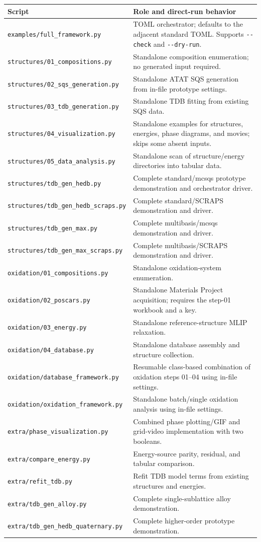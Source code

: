 \documentclass[11pt,letterpaper]{article}
\newcommand{\file}[1]{\nolinkurl{#1}}
\begin{document}
\begin{longtable}{p{}p{}}
\toprule
Script & Role and direct-run behavior \\
\midrule
\endhead
\file{examples/full_framework.py} & TOML orchestrator; defaults to the adjacent standard TOML. Supports \file{--check} and \file{--dry-run}. \\
\file{structures/01_compositions.py} & Standalone composition enumeration; no generated input required. \\
\file{structures/02_sqs_generation.py} & Standalone ATAT SQS generation from in-file prototype settings. \\
\file{structures/03_tdb_generation.py} & Standalone TDB fitting from existing SQS data. \\
\file{structures/04_visualization.py} & Standalone examples for structures, energies, phase diagrams, and movies; skips some absent inputs. \\
\file{structures/05_data_analysis.py} & Standalone scan of structure/energy directories into tabular data. \\
\file{structures/tdb_gen_hedb.py} & Complete standard/mcsqs prototype demonstration and orchestrator driver. \\
\file{structures/tdb_gen_hedb_scraps.py} & Complete standard/SCRAPS demonstration and driver. \\
\file{structures/tdb_gen_max.py} & Complete multibasis/mcsqs demonstration and driver. \\
\file{structures/tdb_gen_max_scraps.py} & Complete multibasis/SCRAPS demonstration and driver. \\
\file{oxidation/01_compositions.py} & Standalone oxidation-system enumeration. \\
\file{oxidation/02_poscars.py} & Standalone Materials Project acquisition; requires the step-01 workbook and a key. \\
\file{oxidation/03_energy.py} & Standalone reference-structure MLIP relaxation. \\
\file{oxidation/04_database.py} & Standalone database assembly and structure collection. \\
\file{oxidation/database_framework.py} & Resumable class-based combination of oxidation steps 01--04 using in-file settings. \\
\file{oxidation/oxidation_framework.py} & Standalone batch/single oxidation analysis using in-file settings. \\
\file{extra/phase_visualization.py} & Combined phase plotting/GIF and grid-video implementation with two booleans. \\
\file{extra/compare_energy.py} & Energy-source parity, residual, and tabular comparison. \\
\file{extra/refit_tdb.py} & Refit TDB model terms from existing structures and energies. \\
\file{extra/tdb_gen_alloy.py} & Complete single-sublattice alloy demonstration. \\
\file{extra/tdb_gen_hedb_quaternary.py} & Complete higher-order prototype demonstration. \\
\bottomrule
\end{longtable}
\end{document}
